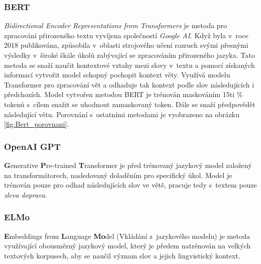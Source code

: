\subsubsection*{BERT}
\textit{Bidirectional Encoder Representations from Transformers} je metoda pro zpracování přirozeného textu vyvíjena společností \textit{Google AI}. Když byla v~roce 2018 publikována, způsobila v~oblasti strojového učení rozruch svými přesnými výsledky v~široké škále úkolů zabývající se zpracováním přirozeného jazyka\cite{horev_2018}. Tato metoda se snaží naučit kontextové vztahy mezi slovy v~textu a pomocí získaných informací vytvořit model schopný pochopit kontext věty. Využívá modelu Transformer\cite{vaswani2017attention} pro zpracování vět a odhaduje tak kontext podle slov následujících i předchozích. Model vytvořen metodou BERT je trénován maskováním 15ti \% tokenů s~cílem snažit se uhodnout zamaskovaný token. Dále se snaží předpovědět následující větu\cite{devlin2019bert}\cite{valkov_2020}\cite{ghati_2020}. Porovnání s~ostatními metodami je vyobrazeno na obrázku \ref{fig:Bert_porovnani}.


\subsubsection*{OpenAI GPT}
\textbf{G}enerative \textbf{P}re-trained \textbf{T}ransformer je před trénovaný jazykový model založený na transformátorech, nasledovaný doladěním pro specifický úkol\cite{radford2019language}\cite{ghati_2020}. Model je trénován pouze pro odhad následujících slov ve větě, pracuje tedy s~textem pouze \textit{zleva doprava}. 

\subsubsection*{ELMo}
\textbf{E}mbeddings from \textbf{L}anguage \textbf{Mo}del (Vkládání z~jazykového modelu) je metoda využívající obousměrný jazykový model, který je předem natrénován na velkých textových korpusech, aby se naučil význam slov a jejich lingvistický kontext\cite{peters2018deep}\cite{ghati_2020}.


